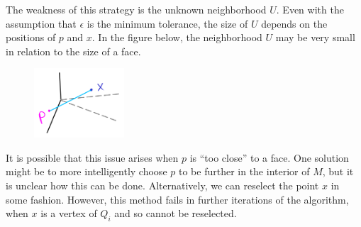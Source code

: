 \documentclass[12pt]{article}
\begin{document}
\begin{flushleft}
The weakness of this strategy is the unknown neighborhood $U$.
Even with the assumption that $\epsilon$ is the minimum tolerance, the size of $U$ depends on the positions of $p$ and $x$.
In the figure below, the neighborhood $U$ may be very small in relation to the size of a face.
\begin{figure}[H]
	\centering
	\includegraphics[width=0.3\textwidth]{epsilon_weakness.png}
\end{figure}
It is possible that this issue arises when $p$ is ``too close'' to a face.
One solution might be to more intelligently choose $p$ to be further in the interior of $M$, but it is unclear how this can be done.
Alternatively, we can reselect the point $x$ in some fashion.
However, this method fails in further iterations of the algorithm, when $x$ is a vertex of $Q_i$ and so cannot be reselected.










































\end{flushleft}
\end{document}
